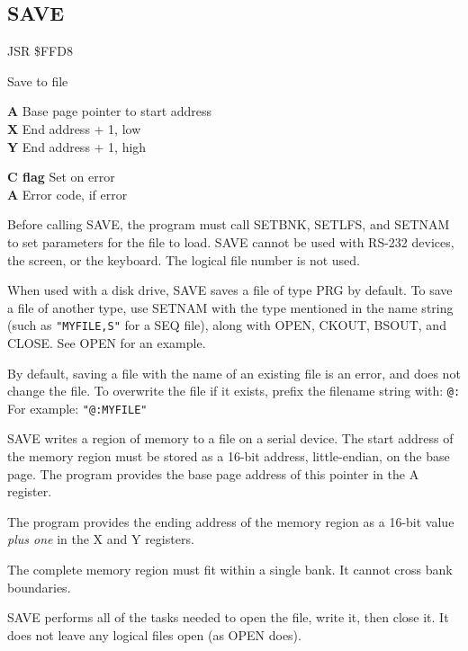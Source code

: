 
\newpage
\subsection{SAVE}
\label{KERNAL Jump Table!SAVE}
\begin{description}[leftmargin=2cm,style=nextline]
    \item [Address:] JSR \$FFD8
    \item [Description:] Save to file
    \item [Inputs:]
        \textbf{A} Base page pointer to start address \\
        \textbf{X} End address + 1, low \\
        \textbf{Y} End address + 1, high
    \item [Outputs:]
        \textbf{C flag} Set on error \\
        \textbf{A} Error code, if error
    \item [Remarks:]
        Before calling SAVE, the program must call SETBNK, SETLFS, and SETNAM to set parameters for the file to load. SAVE cannot be used with RS-232 devices, the screen, or the keyboard. The logical file number is not used.

        When used with a disk drive, SAVE saves a file of type PRG by default. To save a file of another type, use SETNAM with the type mentioned in the name string (such as \texttt{"MYFILE,S"} for a SEQ file), along with OPEN, CKOUT, BSOUT, and CLOSE. See OPEN for an example.

        By default, saving a file with the name of an existing file is an error, and does not change the file. To overwrite the file if it exists, prefix the filename string with: \texttt{@:} For example: \texttt{"@:MYFILE"}

        SAVE writes a region of memory to a file on a serial device. The start address of the memory region must be stored as a 16-bit address, little-endian, on the base page. The program provides the base page address of this pointer in the A register.

        The program provides the ending address of the memory region as a 16-bit value \emph{plus one} in the X and Y registers.

        The complete memory region must fit within a single bank. It cannot cross bank boundaries.

        SAVE performs all of the tasks needed to open the file, write it, then close it. It does not leave any logical files open (as OPEN does).


\end{description}
